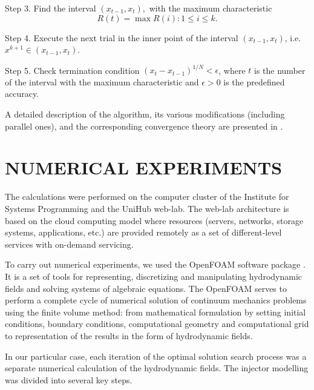 \documentclass{aip-cp}
\begin{document}
Step 3. Find the interval $(x_{t-1},x_t),$ with the maximum characteristic 
\[
R(t)=\max{R(i):1 \leq i \leq k}.
\]

Step 4. Execute the next trial in the inner point of the interval  $(x_{t-1},x_t)$, i.e. $x^{k+1} \in (x_{t-1},x_t)$.

Step 5. Check termination condition  $\left(x_t-x_{t-1}\right)^{1/N}<\epsilon$, where $t$   is the number of the interval with the maximum characteristic and $\epsilon>0$ is the predefined accuracy.

A detailed description of the algorithm, its various modifications (including parallel ones), and the corresponding convergence  theory are presented in \cite{Strongin2000,Barkalov2010,Strongin2020}.
	

\section{NUMERICAL EXPERIMENTS}

The calculations were performed on the computer cluster of the Institute for Systems Programming and the UniHub web-lab. The web-lab architecture is based on the cloud computing model where resources (servers, networks, storage systems, applications, etc.) are provided remotely as a set of different-level services with on-demand servicing.

To carry out numerical experiments, we used the OpenFOAM software package \cite{OpenFOAM}. It is a set of tools for representing, discretizing and manipulating hydrodynamic fields and solving systems of algebraic equations. The OpenFOAM serves to perform a complete cycle of numerical solution of continuum mechanics problems using the finite volume method: from mathematical formulation by setting initial conditions, boundary conditions, computational geometry and computational grid to representation of the results in the form of hydrodynamic fields.

In our particular case, each iteration of the optimal solution search process was a separate numerical calculation of the hydrodynamic fields. The injector modelling was divided into several key steps.
\end{document}
